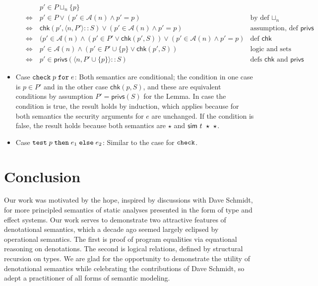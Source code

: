 \documentclass[submission,copyright,creativecommons]{eptcs}
\newcommand{\chk}[2]{\CHK\;#1\;\FOR\;#2}
\newcommand{\test}[3]{\TEST\;#1\;\THEN\;#2\;\ELSE\;#3}
\newcommand{\ELSE}{\mbox{\texttt{else}}}
\newcommand{\FOR}{\mbox{\texttt{for}}}
\newcommand{\THEN}{{\texttt{then}}}
\newcommand{\A}{\mathcal{A}}
\newcommand{\union}{\cup}
\newcommand{\tuple}[1]{\langle #1 \rangle}
\newcommand{\CHK}{\mbox{\texttt{check}}}
\newcommand{\TEST}{\mbox{\texttt{test}}}
\renewcommand{\check}{\textsf{chk}}
\newcommand{\privs}{\textsf{privs}}
\newcommand{\Sim}{\textsf{sim}}
\newcommand{\n}{n} \newcommand{\p}{p} \newcommand{\Ps}{\Pi} \newcommand{\h}{h}
\renewcommand{\iff}{\mathbin{\:\Leftrightarrow\:}}
\newenvironment{xproof}{\begin{trivlist}\item[\hskip\labelsep{\bf  
Proof:}]}{\end{trivlist}}
\begin{document}
\begin{xproof}
\begin{itemize}
\[\begin{array}{lcll}
& & \p'\in P\sqcup_{\n}\{\p\} \\
&\iff& \p'\in P \lor (\p'\in \A(\n) \land \p'=\p) & \mbox{by def $\sqcup_{\n}$} \\
&\iff& \check(\p', \tuple{\n,P'}::S ) 
       \lor (\p'\in \A(\n) \land \p'=\p) & \mbox{assumption, def $\privs$} \\
&\iff& (\p'\in \A(n)\land (\p'\in P'\lor \check(\p', S )) 
       \lor (\p'\in \A(\n) \land \p'=\p) & \mbox{def $\check$} \\
&\iff& \p'\in \A(n)\land (\p'\in P'\union\{\p\} \lor \check(\p', S ) ) & \mbox{logic
  and sets}\\
&\iff& \p'\in \privs( \tuple{\n,P'\union\{\p\}}::S ) & \mbox{defs $\check$ and
  $\privs$} 
\end{array} \]
\item Case $\chk{\p}{e}$:
Both semantics are conditional; the condition in one case is $\p\in P'$ and 
in the other case $\check(\p,S)$, and these are equivalent conditions by 
assumption $P'=\privs(S)$ for the Lemma.   In case the condition is true, 
the result holds by induction, which applies because for both semantics the 
security arguments for $e$ are unchanged.
If the condition is false, the result holds because both semantics are $\star$
and $\Sim~\ty~\star~\star$.
\item Case $\test{\p}{e_1}{e_2}$:
Similar to the case for $\CHK$.
\end{itemize}
\end{xproof}

\section{Conclusion}
\label{sec:disc}


Our work was motivated by the hope, inspired by discussions with Dave Schmidt, for more principled semantics of static analyses presented in the form of type and effect systems.  
Our work serves to demonstrate two attractive features of denotational semantics, which a decade ago seemed largely eclipsed by operational semantics.  
The first is proof of program equalities via equational reasoning on denotations.
The second is logical relations, defined by structural recursion on types.
We are glad for the opportunity to demonstrate the utility of denotational semantics while celebrating the contributions of Dave Schmidt, so adept a practitioner of all forms of semantic modeling.












\end{document}
